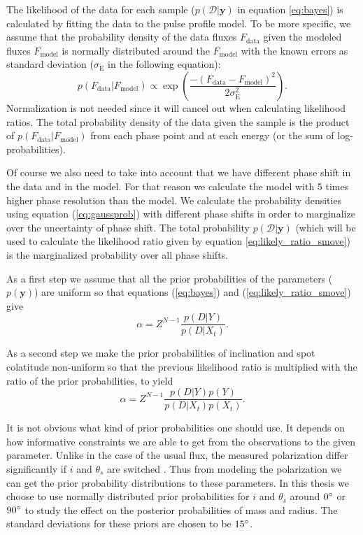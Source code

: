 \documentclass{wihuri}
\def\be{\begin{equation}}
\def\ee{\end{equation}}
\def\thetas{\theta_{s}}
\begin{document}
The likelihood of the data for each sample ($p(\mathcal{D}|\textbf{y})$ in equation \ref{eq:bayes}) is calculated by fitting the data to the pulse profile model. To be more specific, we assume that the probability density of the data fluxes $F_{\mathrm{data}}$ given the modeled fluxes $F_{\mathrm{model}}$  is normally distributed around the $F_{\mathrm{model}}$ with the known errors as standard deviation ($\sigma_{\mathrm{E}}$ in the following equation): 
\be \label{eq:gaussprob}
p(F_{\mathrm{data}}|F_{\mathrm{model}}) \propto \exp \left (\frac{-(F_{\mathrm{data}}-F_{\mathrm{model}})^{2}}{2\sigma_{\mathrm{E}}^{2}} \right ).
\ee
Normalization is not needed since it will cancel out when calculating likelihood ratios. The total probability density of the data given the sample is the product of $p(F_{\mathrm{data}}|F_{\mathrm{model}})$ from each phase point and at each energy (or the sum of log-probabilities). 

Of course we also need to take into account that we have different phase shift in the data and in the model. For that reason we calculate the model with 5 times higher phase resolution than the model. We calculate the probability densities using equation (\ref{eq:gaussprob}) with different phase shifts in order to marginalize over the uncertainty of phase shift. %
The total probability $p(\mathcal{D}|\textbf{y})$ (which will be used to calculate the likelihood ratio given by equation \ref{eq:likely_ratio_smove}) is the marginalized probability over all phase shifts. 

As a first step we assume that all the prior probabilities of the parameters ($p(\textbf{y})$) are uniform so that equations (\ref{eq:bayes}) and (\ref{eq:likely_ratio_smove}) give 
\be \label{eq:alpha1}
\alpha = Z^{N-1}\frac{p(D|Y)}{p(D|X_{t})}.
\ee

As a second step we make the prior probabilities of inclination and spot colatitude non-uniform so that the previous likelihood ratio is multiplied with the ratio of the prior probabilities, to yield
\be \label{eq:alpha2}
\alpha = Z^{N-1}\frac{p(D|Y)p(Y)}{p(D|X_{t})p(X_{t})}.
\ee

It is not obvious what kind of prior probabilities one should use. It depends on how informative constraints we are able to get from the observations to the given parameter. Unlike in the case of the usual flux, the measured polarization differ significantly if $i$ and $\thetas$ are switched \cite{poutaviironen}. Thus from modeling the polarization we can get the prior probability distributions to these parameters. In this thesis we choose to use normally distributed prior probabilities for $i$ and $\thetas$ around $0 \degree$ or $90 \degree$ to study the effect on the posterior probabilities of mass and radius. The standard deviations for these priors are chosen to be $15 \degree$. 
\end{document}
